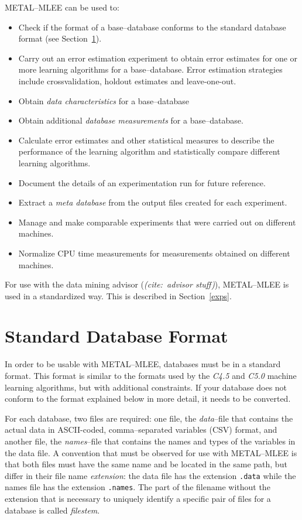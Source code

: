 \documentclass[a4paper,10pt,twoside]{article}
\newcommand{\eenameshort}{\textsf{METAL--MLEE}}
\newcommand{\citex}[1]{\textsl{(cite:~{#1})}}
\begin{document}
\eenameshort{} can be used to:
\begin{itemize}
\item Check if the format of a base--database conforms to 
the standard database format (see Section~\ref{dbformat}).
\item Carry out an error estimation experiment to obtain
error estimates for one or more learning algorithms for
a base--database. Error estimation strategies include 
crossvalidation, holdout estimates and leave-one-out.
\item Obtain \emph{data characteristics} for a base--database
\item Obtain additional \emph{database measurements} for a
base--database.
\item Calculate error estimates and other statistical 
measures to describe the performance of the learning 
algorithm and statistically compare different learning
algorithms.
\item Document the details of an experimentation run for 
future reference.
\item Extract a \emph{meta database} from the output files
created for each experiment.
\item Manage and make comparable experiments that were 
carried out on different machines.
\item Normalize CPU time measurements for measurements
obtained on different machines.
\end{itemize}

For use with the data mining advisor (\citex{advisor  stuff}), 
\eenameshort{} is used in a standardized way. This is described
in Section~\ref{exps}.



\section{Standard Database Format}
\label{dbformat}
In order to be usable with \eenameshort{}, databases must
be in a standard format. This format is similar to the formats
used by the \textsl{C4.5} \cite{Quinlan:1993} and 
\textsl{C5.0} machine learning
algorithms, but with additional constraints. 
If your database does not conform to the format
explained below in more detail, it needs to be 
converted. 

For each database, two files are required: one file, the
\emph{data}--file that contains
the actual data in ASCII-coded, comma--separated variables (CSV)
format, and another 
file, the \emph{names}--file that contains the names
 and types of the variables in the 
data file. A convention that must be observed for use with
\eenameshort{} is that both files must have the same 
name and be located in the same path, but differ
in their file name \emph{extension}: the data file
has the extension \texttt{.data} while the names file
has the extension \texttt{.names}. The part of the filename
without the extension that is necessary to uniquely identify
a specific pair of files for a database is called
\emph{filestem}.
\end{document}
